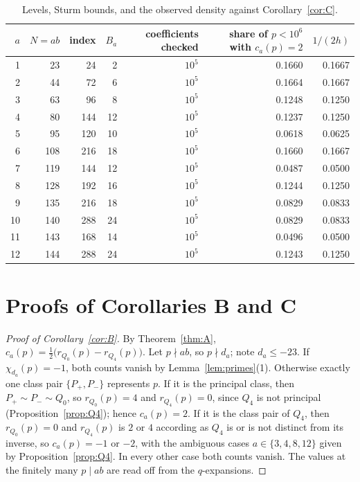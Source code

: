 \documentclass[11pt]{amsart}
\theoremstyle{definition}
\theoremstyle{remark}
\begin{document}
\begin{table}[h]
\centering\small
\renewcommand{\arraystretch}{1.1}
\begin{tabular}{@{}r r r r r r r@{}}
\toprule
$a$ & $N=ab$ & index & $B_a$ & coefficients checked & share of $p<10^6$ with $c_a(p)=2$ & $1/(2h)$\\
\midrule
1 & 23 & 24 & 2 & $10^5$ & 0.1660 & 0.1667\\
2 & 44 & 72 & 6 & $10^5$ & 0.1664 & 0.1667\\
3 & 63 & 96 & 8 & $10^5$ & 0.1248 & 0.1250\\
4 & 80 & 144 & 12 & $10^5$ & 0.1237 & 0.1250\\
5 & 95 & 120 & 10 & $10^5$ & 0.0618 & 0.0625\\
6 & 108 & 216 & 18 & $10^5$ & 0.1660 & 0.1667\\
7 & 119 & 144 & 12 & $10^5$ & 0.0487 & 0.0500\\
8 & 128 & 192 & 16 & $10^5$ & 0.1244 & 0.1250\\
9 & 135 & 216 & 18 & $10^5$ & 0.0829 & 0.0833\\
10 & 140 & 288 & 24 & $10^5$ & 0.0829 & 0.0833\\
11 & 143 & 168 & 14 & $10^5$ & 0.0496 & 0.0500\\
12 & 144 & 288 & 24 & $10^5$ & 0.1243 & 0.1250\\
\bottomrule
\end{tabular}
\caption{Levels, Sturm bounds, and the observed density against Corollary~\ref{cor:C}.}\label{tab:sturm}
\end{table}

\section{Proofs of Corollaries B and C}\label{sec:proofBC}

\begin{proof}[Proof of Corollary~\ref{cor:B}]
By Theorem~\ref{thm:A}, $c_a(p)=\frac12\bigl(r_{Q_0}(p)-r_{Q_4}(p)\bigr)$. Let $p\nmid ab$, so $p\nmid d_a$; note $d_a\le-23$. If $\chi_{d_a}(p)=-1$, both counts vanish by Lemma~\ref{lem:primes}(1). Otherwise exactly one class pair $\{P_+,P_-\}$ represents $p$. If it is the principal class, then $P_+\sim P_-\sim Q_0$, so $r_{Q_0}(p)=4$ and $r_{Q_4}(p)=0$, since $Q_4$ is not principal (Proposition~\ref{prop:Q4}); hence $c_a(p)=2$. If it is the class pair of $Q_4$, then $r_{Q_0}(p)=0$ and $r_{Q_4}(p)$ is $2$ or $4$ according as $Q_4$ is or is not distinct from its inverse, so $c_a(p)=-1$ or $-2$, with the ambiguous cases $a\in\{3,4,8,12\}$ given by Proposition~\ref{prop:Q4}. In every other case both counts vanish. The values at the finitely many $p\mid ab$ are read off from the $q$-expansions.
\end{proof}
\end{document}
